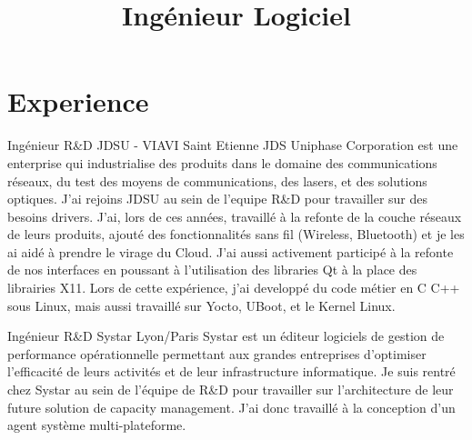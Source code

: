 \documentclass[11pt,a4paper,sans]{moderncv}
\title{Ing\'enieur Logiciel}
\begin{document}
\makecvtitle

\section{Experience}

{Ing\'enieur R\&D}
{JDSU - VIAVI}
{Saint Etienne}
{}
{JDS Uniphase Corporation est une enterprise qui industrialise des produits
dans le domaine des communications r\'eseaux, du test des moyens de
communications, des lasers, et des solutions optiques.
J'ai rejoins JDSU au sein de l'equipe R\&D pour travailler sur des besoins
drivers. J'ai, lors de ces ann\'ees, travaill\'e \`a la refonte de la couche
r\'eseaux de leurs produits, ajout\'e des fonctionnalit\'es sans fil
(Wireless, Bluetooth) et je les ai aid\'e \`a prendre le virage du Cloud.
J'ai aussi activement particip\'e \`a la refonte de nos interfaces en poussant
\`a l'utilisation des libraries Qt \`a la place des librairies X11.
Lors de cette exp\'erience, j'ai developp\'e du code m\'etier en C C++ sous
Linux, mais aussi travaill\'e sur Yocto, UBoot, et le Kernel Linux.
}

{Ing\'enieur R\&D}
{Systar}
{Lyon/Paris}
{}
{Systar est un \'editeur logiciels de gestion de performance 
op\'erationnelle permettant aux grandes entreprises d'optimiser l'efficacit\'e
de leurs activit\'es et de leur infrastructure informatique. 
Je suis rentr\'e chez Systar au sein de l'\'equipe de R\&D pour travailler sur 
l'architecture de leur future solution de capacity management. J'ai donc
travaill\'e \`a la conception d'un agent syst\`eme multi-plateforme.
}
\end{document}

